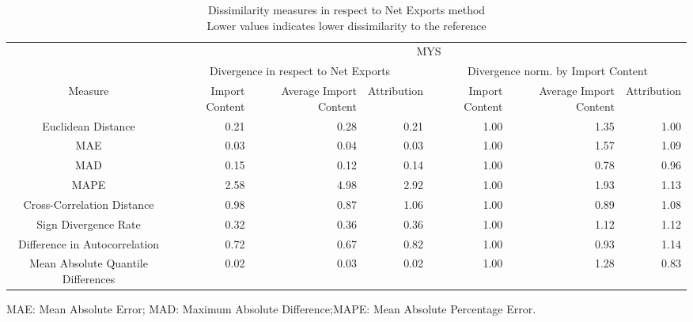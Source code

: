 \begin{table}[t]
\caption*{
{\large Dissimilarity measures in respect to Net Exports method} \\ 
{\small Lower values indicates lower dissimilarity to the reference}
} 
\fontsize{15.0pt}{18.0pt}\selectfont
\begin{tabular*}{\linewidth}{@{\extracolsep{\fill}}crrrrrr}
\toprule
 & \multicolumn{6}{c}{MYS} \\ 
\cmidrule(lr){2-7}
 & \multicolumn{3}{c}{Divergence in respect to Net Exports} & \multicolumn{3}{c}{Divergence norm. by Import Content} \\ 
\cmidrule(lr){2-4} \cmidrule(lr){5-7}
Measure & Import Content & Average Import Content & Attribution & Import Content & Average Import Content & Attribution \\ 
\midrule\addlinespace[2.5pt]
Euclidean Distance & 0.21 & 0.28 & 0.21 & 1.00 & 1.35 & 1.00 \\ 
MAE & 0.03 & 0.04 & 0.03 & 1.00 & 1.57 & 1.09 \\ 
MAD & 0.15 & 0.12 & 0.14 & 1.00 & 0.78 & 0.96 \\ 
MAPE & 2.58 & 4.98 & 2.92 & 1.00 & 1.93 & 1.13 \\ 
Cross-Correlation Distance & 0.98 & 0.87 & 1.06 & 1.00 & 0.89 & 1.08 \\ 
Sign Divergence Rate & 0.32 & 0.36 & 0.36 & 1.00 & 1.12 & 1.12 \\ 
Difference in Autocorrelation & 0.72 & 0.67 & 0.82 & 1.00 & 0.93 & 1.14 \\ 
Mean Absolute Quantile Differences & 0.02 & 0.03 & 0.02 & 1.00 & 1.28 & 0.83 \\ 
\bottomrule
\end{tabular*}
\begin{minipage}{\linewidth}
MAE: Mean Absolute Error; MAD: Maximum Absolute Difference;MAPE: Mean Absolute Percentage Error.\\
\end{minipage}
\end{table}

